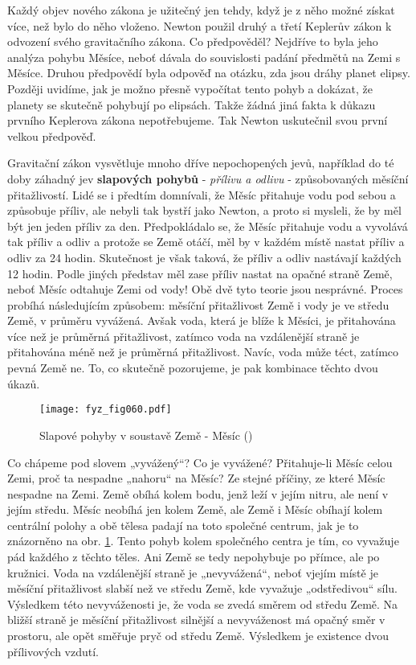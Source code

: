 {    Každý objev nového zákona je užitečný jen tehdy, když je z něho možné získat více, než bylo do 
    něho vloženo. Newton použil druhý a třetí Keplerův zákon k odvození svého gravitačního zákona. 
    Co předpověděl? Nejdříve to byla jeho analýza pohybu Měsíce, neboť dávala do souvislosti padání 
    předmětů na Zemi s  Měsíce. Druhou předpovědí byla odpověď na otázku, zda jsou 
    dráhy planet elipsy. Později uvidíme, jak je možno přesně vypočítat tento pohyb a dokázat, že 
    planety se skutečně pohybují po elipsách. Takže žádná jiná fakta k důkazu prvního Keplerova 
    zákona nepotřebujeme. Tak Newton uskutečnil svou první velkou předpověď.

    Gravitační zákon vysvětluje mnoho dříve nepochopených jevů, například do té doby záhadný jev 
    \textbf{slapových pohybů} - \emph{přílivu a odlivu} - způsobovaných měsíční přitažlivostí. Lidé 
    se i předtím domnívali, že Měsíc přitahuje vodu pod sebou a způsobuje příliv, ale nebyli tak 
    bystří jako Newton, a proto si mysleli, že by měl být jen jeden příliv za den. Předpokládalo 
    se, že Měsíc přitahuje vodu a vyvolává tak příliv a odliv a protože se Země otáčí, měl by v 
    každém místě nastat příliv a odliv za \num{24} hodin. Skutečnost je však taková, že příliv a 
    odliv nastávají každých \num{12} hodin. Podle jiných představ měl zase příliv nastat na opačné 
    straně Země, neboť Měsíc odtahuje Zemi od vody! Obě dvě tyto teorie jsou nesprávné. Proces 
    probíhá následujícím způsobem: měsíční přitažlivost Země i vody je ve středu Země, v průměru 
    vyvážená. Avšak voda, která je blíže k Měsíci, je přitahována více než je průměrná 
    přitažlivost, zatímco voda na vzdálenější straně je přitahována méně než je průměrná 
    přitažlivost. Navíc, voda může téct, zatímco pevná Země ne. To, co skutečně pozorujeme, je pak 
    kombinace těchto dvou úkazů.

    \begin{figure}[ht!]  %
      \centering
      \texttt{[image: fyz\_fig060.pdf]}
      \caption{Slapové pohyby v soustavě Země - Měsíc (\cite[s.~97]{Feynman01})}
      \label{fyz:fig060}
    \end{figure}
    Co chápeme pod slovem „vyvážený“? Co je vyvážené? Přitahuje-li Měsíc celou Zemi, proč ta 
    nespadne „nahoru“ na Měsíc? Ze stejné příčiny, ze které Měsíc nespadne na Zemi. Země obíhá 
    kolem bodu, jenž leží v jejím nitru, ale není v jejím středu. Měsíc neobíhá jen kolem Země, ale 
    Země i Měsíc obíhají kolem centrální polohy a obě tělesa padají na toto společné centrum, jak 
    je to znázorněno na obr. \ref{fyz:fig060}. Tento pohyb kolem společného centra je tím, co 
    vyvažuje pád každého z těchto těles. Ani Země se tedy nepohybuje po přímce, ale po kružnici. 
    Voda na vzdálenější straně je „nevyvážená“, neboť vjejím místě je měsíční přitažlivost slabší 
    než ve středu Země, kde vyvažuje „odstředivou“ sílu. Výsledkem této nevyváženosti je, že voda 
    se zvedá směrem od středu Země. Na bližší straně je měsíční přitažlivost silnější a 
    nevyváženost má opačný směr v prostoru, ale opět směřuje pryč od středu Země. Výsledkem je 
    existence dvou přílivových vzdutí.
    
}
